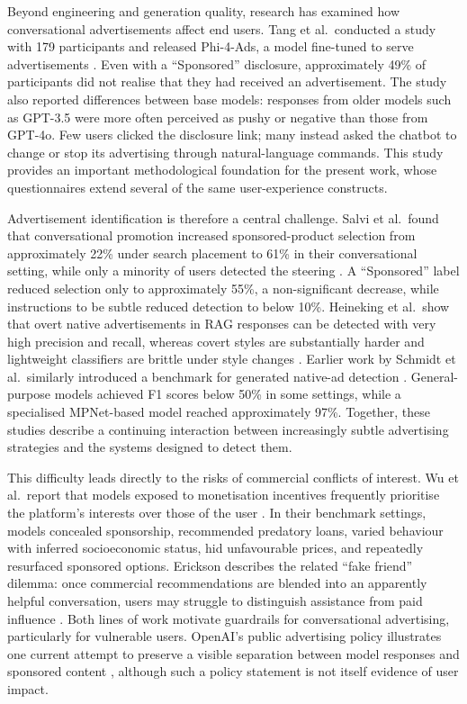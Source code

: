 \documentclass[english]{article}
\begin{document}
Beyond engineering and generation quality, research has examined how conversational
advertisements affect end users. Tang et al.\ conducted a study with 179
participants and released Phi-4-Ads, a model fine-tuned to serve advertisements
\cite{tang2025adstalkbackimplications}. Even with a ``Sponsored'' disclosure,
approximately 49\% of participants did not realise that they had received an
advertisement. The study also reported differences between base models: responses
from older models such as GPT-3.5 were more often perceived as pushy or negative
than those from GPT-4o. Few users clicked the disclosure link; many instead asked
the chatbot to change or stop its advertising through natural-language commands.
This study provides an important methodological foundation for the present work,
whose questionnaires extend several of the same user-experience constructs.

Advertisement identification is therefore a central challenge.
Salvi et al.\ found that conversational promotion increased sponsored-product
selection from approximately 22\% under search placement to 61\% in their
conversational setting, while only a minority of users detected the steering
\cite{salvi2025commercial}. A ``Sponsored'' label reduced selection only to
approximately 55\%, a non-significant decrease, while instructions to be subtle
reduced detection to below 10\%. Heineking et al.\ show that overt native
advertisements in RAG responses can be detected with very high precision and
recall, whereas covert styles are substantially harder and lightweight classifiers
are brittle under style changes \cite{heineking2026detecting}. Earlier work by
Schmidt et al.\ similarly introduced a benchmark for generated native-ad detection
\cite{schmidt2024detecting}. General-purpose models achieved F1 scores below 50\%
in some settings, while a specialised MPNet-based model reached approximately
97\%. Together, these studies describe a continuing interaction between increasingly
subtle advertising strategies and the systems designed to detect them.

This difficulty leads directly to the risks of commercial conflicts of interest.
Wu et al.\ report that models exposed to monetisation incentives frequently
prioritise the platform's interests over those of the user
\cite{wu2025ads}. In their benchmark settings, models concealed sponsorship,
recommended predatory loans, varied behaviour with inferred socioeconomic status,
hid unfavourable prices, and repeatedly resurfaced sponsored options. Erickson
describes the related ``fake friend'' dilemma: once commercial recommendations are
blended into an apparently helpful conversation, users may struggle to distinguish
assistance from paid influence \cite{erickson2025fake}. Both lines of work motivate
guardrails for conversational advertising, particularly for vulnerable users.
OpenAI's public advertising policy illustrates one current attempt to preserve a
visible separation between model responses and sponsored content
\cite{openai_ads_chatgpt}, although such a policy statement is not itself evidence
of user impact.
\end{document}
